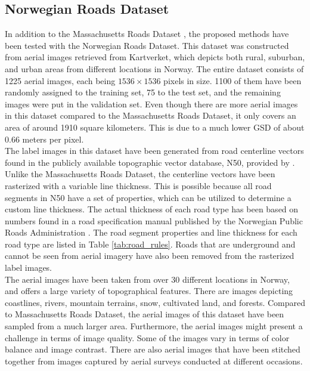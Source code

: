 
\subsection{Norwegian Roads Dataset}
In addition to the Massachusetts Roads Dataset \citep{MnihThesis}, the proposed methods have been tested with the Norwegian Roads Dataset. This dataset was constructed from aerial images retrieved from Kartverket, which depicts both rural, suburban, and urban areas from different locations in Norway. The entire dataset consists of 1225 aerial images, each being $1536\times 1536$ pixels in size. 1100 of them have been randomly assigned to the training set, 75 to the test set, and the remaining images were put in the validation set. Even though there are more aerial images in this dataset compared to the Massachusetts Roads Dataset, it only covers an area of around 1910 square kilometers. This is due to a much lower \ac{GSD} of about 0.66 meters per pixel. \\


The label images in this dataset have been generated from road centerline vectors found in the publicly available topographic vector database, N50, provided by \cite{Kartverket}. Unlike the Massachusetts Roads Dataset, the centerline vectors have been rasterized with a variable line thickness. This is possible because all road segments in N50 have a set of properties, which can be utilized to determine a custom line thickness. The actual thickness of each road type has been based on numbers found in a road specification manual published by the Norwegian Public Roads Administration \citep{Norwegian_road_manual}. The road segment properties and line thickness for each road type are listed in Table \ref{tab:road_rules}. Roads that are underground and cannot be seen from aerial imagery have also been removed from the rasterized label images.\\

The aerial images have been taken from over 30 different locations in Norway, and offers a large variety of topographical features. There are images depicting coastlines, rivers, mountain terrains, snow, cultivated land, and forests. Compared to Massachusetts Roads Dataset, the aerial images of this dataset have been sampled from a much larger area. Furthermore, the aerial images might present a challenge in terms of image quality. Some of the images vary  in terms of color balance and image contrast. There are also aerial images that have been stitched together from images captured by aerial surveys conducted at different occasions.\\

